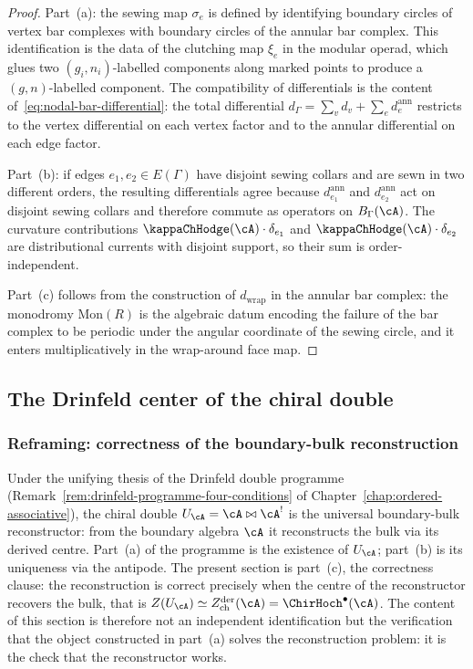\begin{proof}
Part~(a): the sewing map $\sigma_e$ is defined by identifying
boundary circles of vertex bar complexes with boundary circles
of the annular bar complex. This identification is the data of
the clutching map $\xi_e$ in the modular operad, which glues
two $(g_i,n_i)$-labelled components along marked points to produce
a $(g,n)$-labelled component. The compatibility of differentials
is the content of~\eqref{eq:nodal-bar-differential}: the total
differential $d_\Gamma = \sum_v d_v + \sum_e d^{\mathrm{ann}}_e$
restricts to the vertex differential on each vertex factor and
to the annular differential on each edge factor.

Part~(b): if edges $e_1,e_2\in E(\Gamma)$ have disjoint sewing
collars and are sewn in two different orders, the resulting
differentials agree because
$d^{\mathrm{ann}}_{e_1}$ and $d^{\mathrm{ann}}_{e_2}$ act on
disjoint sewing collars and therefore commute as operators
on $B_\Gamma(\cA)$. The curvature contributions
$\kappaChHodge(\cA)\cdot\delta_{e_1}$ and
$\kappaChHodge(\cA)\cdot\delta_{e_2}$ are distributional currents
with disjoint support, so their sum is order-independent.

Part~(c) follows from the construction of
$d_{\mathrm{wrap}}$ in the annular bar complex: the monodromy
$\mathrm{Mon}(R)$ is the algebraic datum encoding the failure
of the bar complex to be periodic under the angular coordinate
of the sewing circle, and it enters multiplicatively in the
wrap-around face map.
\end{proof}

\subsection{The Drinfeld center of the chiral double}
\label{subsec:drinfeld-center-chiral-double}

\subsubsection*{Reframing: correctness of the boundary-bulk reconstruction}

Under the unifying thesis of the Drinfeld double programme
(Remark~\ref{rem:drinfeld-programme-four-conditions} of
Chapter~\ref{chap:ordered-associative}), the chiral double
$U_\cA = \cA \bowtie \cA^!$ is the universal boundary-bulk
reconstructor: from the boundary algebra $\cA$ it reconstructs
the bulk via its derived centre. Part~(a) of the programme is
the existence of $U_\cA$; part~(b) is its uniqueness via the
antipode. The present section is part~(c), the correctness
clause: the reconstruction is correct precisely when the
centre of the reconstructor recovers the bulk, that is
$Z(U_\cA) \simeq Z^{\mathrm{der}}_{\mathrm{ch}}(\cA) =
\ChirHoch^\bullet(\cA)$. The content of this section is
therefore not an independent identification but the verification
that the object constructed in part~(a) solves the
reconstruction problem: it is the check that the reconstructor
works.

